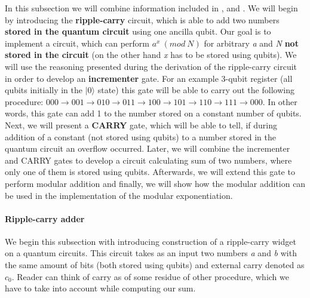 In this subsection we will combine information included in \cite{craig_gidney}, \cite{modular_exponentiation} and \cite{ripple_carry_addition}. We will begin by introducing the \textbf{ripple-carry} circuit, which is able to add two numbers \textbf{stored in the quantum circuit} using one ancilla qubit. Our goal is to implement a circuit, which can perform $a^x\ (mod\ N)$ for arbitrary \textit{a} and \textit{N} \textbf{not stored in the circuit} (on the other hand \textit{x} has to be stored using qubits). We will use the reasoning presented during the derivation of the ripple-carry circuit in order to develop an \textbf{incrementer} gate. For an example 3-qubit register (all qubits initially in the $|0\rangle$ state) this gate will be able to carry out the following procedure: $000  \rightarrow 001 \rightarrow 010 \rightarrow 011 \rightarrow 100 \rightarrow 101 \rightarrow 110 \rightarrow 111 \rightarrow 000$. In other words, this gate can add 1 to the number stored on a constant number of qubits. Next, we will present a \textbf{CARRY} gate, which will be able to tell, if during addition of a constant (not stored using qubits) to a number stored in the quantum circuit an overflow occurred. Later, we will combine the incrementer and CARRY gates to develop a circuit calculating sum of two numbers, where only one of them is stored using qubits. Afterwards, we will extend this gate to perform modular addition and finally, we will show how the modular addition can be used in the implementation of the modular exponentiation.

\paragraph{Ripple-carry adder\\}

We begin this subsection with introducing construction of a ripple-carry widget on a quantum circuits. This circuit takes as an input two numbers \textit{a} and \textit{b} with the same amount of bits (both stored using qubits) and external carry denoted as $c_0$. Reader can think of carry as of some residue of other procedure, which we have to take into account while computing our sum. 

